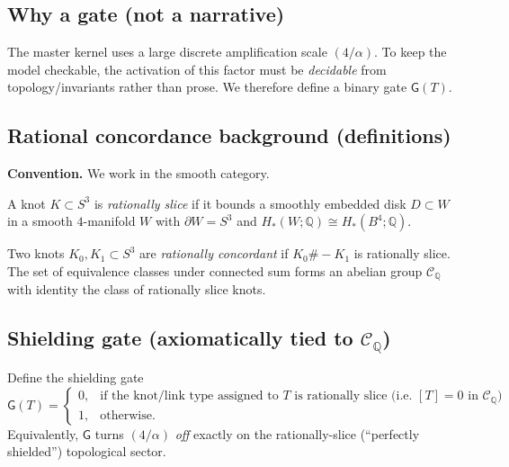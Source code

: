 \documentclass[11pt, a4paper]{article}
\begin{document}
\subsection{Why a gate (not a narrative)}
The master kernel uses a large discrete amplification scale \((4/\alpha)\).  To keep the model checkable, the activation of this factor must be
\emph{decidable} from topology/invariants rather than prose.  We therefore define a binary gate \(\mathsf{G}(T)\).

\subsection{Rational concordance background (definitions)}
\textbf{Convention.} We work in the smooth category.

\begin{definition}\label{def:rationalslice}
A knot \(K\subset S^3\) is \emph{rationally slice} if it bounds a smoothly embedded disk \(D\subset W\) in a smooth \(4\)-manifold \(W\) with
\(\partial W=S^3\) and \(H_*(W;\mathbb{Q})\cong H_*(B^4;\mathbb{Q})\).
\end{definition}

\begin{definition}
Two knots \(K_0,K_1\subset S^3\) are \emph{rationally concordant} if \(K_0\#-K_1\) is rationally slice.
The set of equivalence classes under connected sum forms an abelian group \(\mathcal{C}_{\mathbb{Q}}\) with identity the class of rationally slice knots.
\end{definition}

\subsection{Shielding gate (axiomatically tied to \(\mathcal{C}_{\mathbb{Q}}\))}
\begin{definition}\label{def:gate}
Define the shielding gate
\[
\mathsf{G}(T)=
\begin{cases}
0,& \text{if the knot/link type assigned to }T\text{ is rationally slice (i.e. }[T]=0\text{ in }\mathcal{C}_{\mathbb{Q}}\text{)}\\
1,& \text{otherwise.}
\end{cases}
\]
Equivalently, \(\mathsf{G}\) turns \((4/\alpha)\) \emph{off} exactly on the rationally-slice (``perfectly shielded'') topological sector.
\end{definition}
\end{document}
